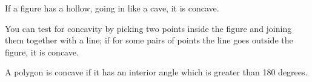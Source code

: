 If a figure has a hollow, going in like a cave, it is concave.
\par
You can test for concavity by picking two points inside the figure and joining 
them together with a line; if for some pairs of points the line goes outside the 
figure, it is concave. 
\par
A polygon is concave if it has an interior angle which is greater than 180 degrees.